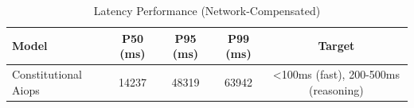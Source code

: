 
\begin{table}[h]
\centering
\caption{Latency Performance (Network-Compensated)}
\label{tab:latency}
\begin{tabular}{lcccc}
\toprule
\textbf{Model} & \textbf{P50 (ms)} & \textbf{P95 (ms)} & \textbf{P99 (ms)} & \textbf{Target} \\
\midrule
Constitutional Aiops & 14237 & 48319 & 63942 & <100ms (fast), 200-500ms (reasoning) \\

\bottomrule
\end{tabular}
\end{table}
